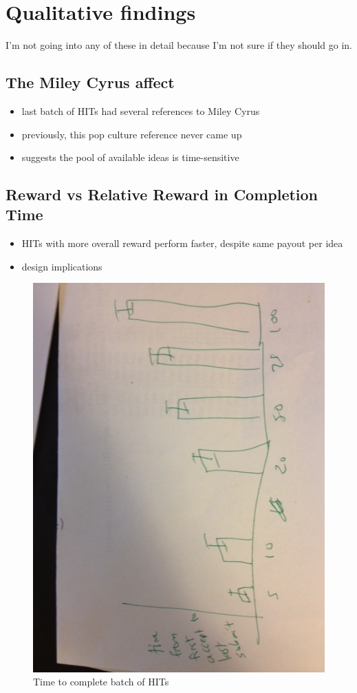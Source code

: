 \section{Qualitative findings}

I'm not going into any of these in detail because I'm not sure if they should go in.

\subsection{The Miley Cyrus affect}

\begin{itemize}
\item last batch of HITs had several references to Miley Cyrus
\item previously, this pop culture reference never came up
\item suggests the pool of available ideas is time-sensitive
\end{itemize}

\subsection{Reward vs Relative Reward in Completion Time}

\begin{itemize}
\item HITs with more overall reward perform faster, despite same payout per idea
\item design implications
\end{itemize}

\begin{figure}[h]
    \centering
    \includegraphics[width=0.9\columnwidth]{batch_time}
    \caption{Time to complete batch of HITs}
\end{figure}

